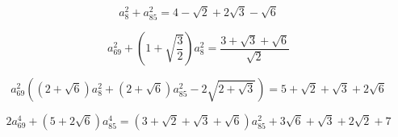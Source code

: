 \documentclass[pdflatex,sn-mathphys-num]{sn-jnl}%
\theoremstyle{thmstyleone}%
\theoremstyle{thmstyletwo}%
\theoremstyle{thmstylethree}%
\begin{document}
\begin{equation*}
    a_{8}^2+a_{85}^2 = 4-\sqrt{2}+2 \sqrt{3}-\sqrt{6} 
\end{equation*}

\begin{equation*}
    a_{69}^2+\left(1+\sqrt{\frac{3}{2}}\right) a_{8}^2 = \frac{3+\sqrt{3}+\sqrt{6}}{\sqrt{2}} 
\end{equation*}

\begin{equation*}
    a_{69}^2 \left(\left(2+\sqrt{6}\right) a_{8}^2+\left(2+\sqrt{6}\right)
   a_{85}^2-2 \sqrt{2+\sqrt{3}}\right) = 5+\sqrt{2}+\sqrt{3}+2 \sqrt{6}
\end{equation*}

\begin{equation*}
    2 a_{69}^4+\left(5+2 \sqrt{6}\right)
   a_{85}^4 = \left(3+\sqrt{2}+\sqrt{3}+\sqrt{6}\right) a_{85}^2+3
   \sqrt{6}+\sqrt{3}+2 \sqrt{2}+7 
\end{equation*}
\end{document}
